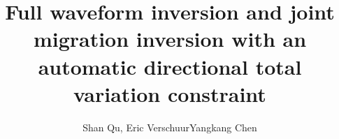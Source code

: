 %

\title{Full waveform inversion and joint migration inversion with an automatic directional total variation constraint}

\renewcommand{\thefootnote}{\fnsymbol{footnote}} 


\author{Shan Qu\footnotemark[1], Eric Verschuur\footnotemark[1] Yangkang Chen\footnotemark[2]}
\address{
\footnotemark[1] Delft University of Technology, Delphi consortium, \\
Mekelweg 5, 2628 CD Delft, Netherlands \\
\footnotemark[2] School of Earth Sciences, \\
Zhejiang University\\
 Hangzhou, Zhejiang Province, 310027
}


\maketitle



